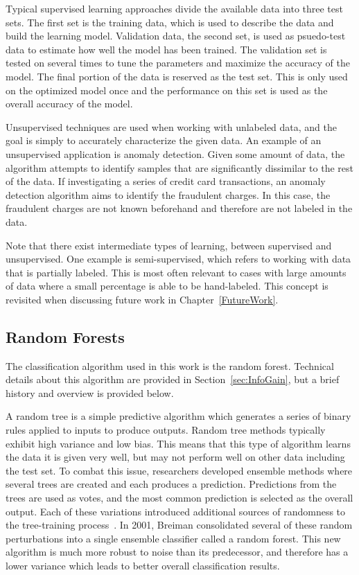 \documentclass[12pt]{report}
\begin{document}
Typical supervised learning approaches divide the available data into three test sets.
The first set is the training data, which is used to describe the data and build the learning model.
Validation data, the second set, is used as psuedo-test data to estimate how well the model has been trained.
The validation set is tested on several times to tune the parameters and maximize the accuracy of the model.
The final portion of the data is reserved as the test set.
This is only used on the optimized model once and the performance on this set is used as the overall accuracy of the model.

Unsupervised techniques are used when working with unlabeled data, and the goal is simply to accurately characterize the given data.
An example of an unsupervised application is anomaly detection.
Given some amount of data, the algorithm attempts to identify samples that are significantly dissimilar to the rest of the data.
If investigating a series of credit card transactions, an anomaly detection algorithm aims to identify the fraudulent charges.
In this case, the fraudulent charges are not known beforehand and therefore are not labeled in the data.

Note that there exist intermediate types of learning, between supervised and unsupervised.
One example is semi-supervised, which refers to working with data that is partially labeled.
This is most often relevant to cases with large amounts of data where a small percentage is able to be hand-labeled.
This concept is revisited when discussing future work in Chapter~\ref{FutureWork}.

\subsection{Random Forests}
The classification algorithm used in this work is the random forest.
Technical details about this algorithm are provided in Section~\ref{sec:InfoGain}, but a brief history and overview is provided below.

A random tree is a simple predictive algorithm which generates a series of binary rules applied to inputs to produce outputs.
Random tree methods typically exhibit high variance and low bias.
This means that this type of algorithm learns the data it is given very well, but may not perform well on other data including the test set.
To combat this issue, researchers developed ensemble methods where several trees are created and each produces a prediction.
Predictions from the trees are used as votes, and the most common prediction is selected as the overall output.
Each of these variations introduced additional sources of randomness to the tree-training process~\cite{breiman1996bagging,dietterich2000experimental,amit1997shape}.
In 2001, Breiman consolidated several of these random perturbations into a single ensemble classifier called a random forest\cite{Breiman2001}.
This new algorithm is much more robust to noise than its predecessor, and therefore has a lower variance which leads to better overall classification results.
\end{document}
